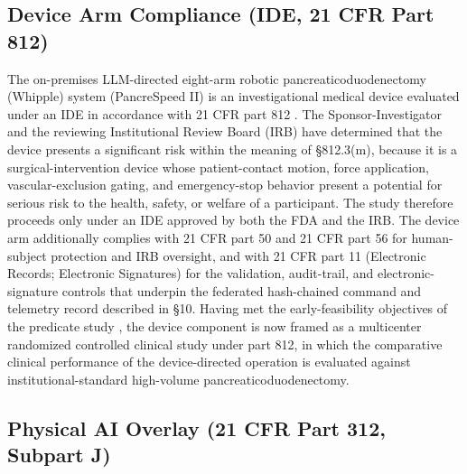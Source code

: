 \subsection{Device Arm Compliance (IDE, 21 CFR Part 812)}

The on-premises LLM-directed eight-arm robotic pancreaticoduodenectomy (Whipple)
system (PancreSpeed II) is an investigational medical device evaluated under an
IDE in accordance with 21 CFR part 812 \cite{ecfr2026part812}. The
Sponsor-Investigator and the reviewing Institutional Review Board (IRB) have
determined that the device presents a significant risk within the meaning of
\S812.3(m), because it is a surgical-intervention device whose patient-contact
motion, force application, vascular-exclusion gating, and emergency-stop behavior
present a potential for serious risk to the health, safety, or welfare of a
participant. The study therefore proceeds only under an IDE approved by both the
FDA and the IRB. The device arm additionally complies with 21 CFR part 50
\cite{ecfr2026part50} and 21 CFR part 56 for human-subject protection and IRB
oversight, and with 21 CFR part 11 (Electronic Records; Electronic Signatures)
\cite{ecfr2026part11} for the validation, audit-trail, and electronic-signature
controls that underpin the federated hash-chained command and telemetry record
described in \S10. Having met the early-feasibility objectives of the predicate
study \cite{kawchak2026phase1}, the device component is now framed as a
multicenter randomized controlled clinical study under part 812, in which the
comparative clinical performance of the device-directed operation is evaluated
against institutional-standard high-volume pancreaticoduodenectomy.

\subsection{Physical AI Overlay (21 CFR Part 312, Subpart J)}

